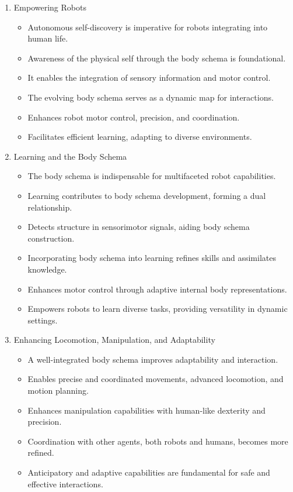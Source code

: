 \documentclass[12pt, a4paper]{article}
\begin{document}
\begin{enumerate}
	\item Empowering Robots
	\begin{itemize}
		\item Autonomous self-discovery is imperative for robots integrating into human life.
		\item Awareness of the physical self through the body schema is foundational.
		\item It enables the integration of sensory information and motor control.
		\item The evolving body schema serves as a dynamic map for interactions.
		\item Enhances robot motor control, precision, and coordination.
		\item Facilitates efficient learning, adapting to diverse environments.
	\end{itemize} 
	\item Learning and the Body Schema
	\begin{itemize}
		\item The body schema is indispensable for multifaceted robot capabilities.
		\item Learning contributes to body schema development, forming a dual relationship.
		\item Detects structure in sensorimotor signals, aiding body schema construction.
		\item Incorporating body schema into learning refines skills and assimilates knowledge.
		\item Enhances motor control through adaptive internal body representations.
		\item Empowers robots to learn diverse tasks, providing versatility in dynamic settings.
	\end{itemize}
	\item Enhancing Locomotion, Manipulation, and Adaptability
	\begin{itemize}
		\item A well-integrated body schema improves adaptability and interaction.
		\item Enables precise and coordinated movements, advanced locomotion, and motion planning.
		\item Enhances manipulation capabilities with human-like dexterity and precision.
		\item Coordination with other agents, both robots and humans, becomes more refined.
		\item Anticipatory and adaptive capabilities are fundamental for safe and effective interactions.

\end{itemize}
\end{enumerate}
\end{document}
